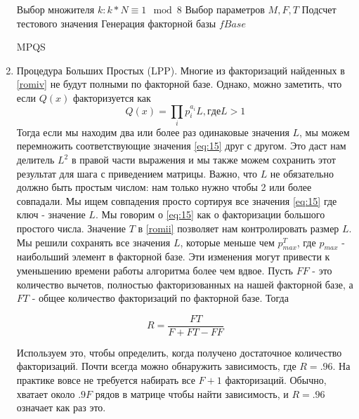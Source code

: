\documentclass[a4paper,12pt]{report}
\begin{document}
\begin{enumerate}[label=\roman*]
\begin{algorithm}[H]
\SetAlgoLined
{}
Выбор множителя $k: k*N \equiv 1 \mod 8$\;
Выбор параметров $M, F, T$\;
Подсчет тестового значения\;
Генерация факторной базы $fBase$\;
\caption{MPQS}
\end{algorithm}
	\item Процедура Больших Простых (LPP). Многие из факторизаций найденных в \ref{romiv} не будут полными по факторной базе. Однако, можно заметить, что если $Q(x)$ факторизуется как \label{romv}
\begin{equation}\label{eq:15}
Q(x) = \prod_{i}p_i^{a_i}L, где L > 1
\end{equation}
		Тогда если мы находим два или более раз одинаковые значения $L$, мы можем перемножить соответствующие значения \eqref{eq:15} друг с другом. Это даст нам делитель $L^2$ в правой части выражения и мы также можем сохранить этот результат для шага с приведением матрицы. Важно, что $L$ не обязательно должно быть простым числом: нам только нужно чтобы 2 или более совпадали. Мы ищем совпадения просто сортируя все значения \eqref{eq:15} где ключ - значение $L$. Мы говорим о \eqref{eq:15} как о факторизации большого простого числа. Значение $T$ в \ref{romii} позволяет нам контролировать размер $L$. Мы решили сохранять все значения $L$, которые меньше чем $p_{max}^T$, где $p_{max}$ - наибольший элемент в факторной базе. Эти изменения могут привести к уменьшению времени работы алгоритма более чем вдвое.
Пусть $FF$ - это количество вычетов, полностью факторизованных на нашей факторной базе, а $FT$ - общее количество факторизаций по факторной базе. Тогда

\begin{equation}\label{eq:16}
R = \frac{FT}{F+FT-FF}
\end{equation}

Используем это, чтобы определить, когда получено достаточное количество факторизаций. Почти всегда можно обнаружить зависимость, где $R = .96$. На практике вовсе не требуется набирать все $F + 1$ факторизаций. Обычно, хватает около $.9F$ рядов в матрице чтобы найти зависимость, и $R = .96$ означает как раз это.


\end{enumerate}
\end{document}
